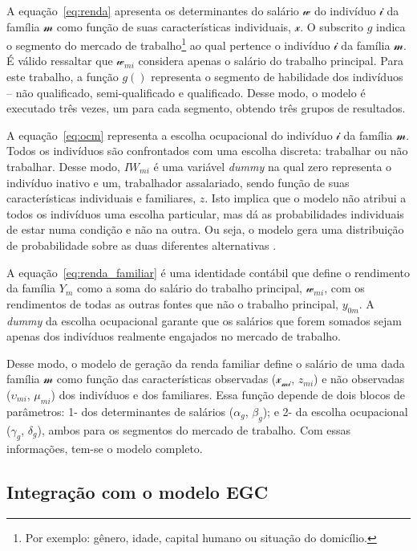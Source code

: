 A equação~\eqref{eq:renda} apresenta os determinantes do salário $\mathcal{w}$ do indivíduo $\mathcal{i}$ da família $\mathcal{m}$ como função de suas características individuais, $\mathcal{x}$. O subscrito $g$ indica o segmento do mercado de trabalho\footnote{Por exemplo: gênero, idade, capital humano ou situação do domicílio.} ao qual pertence o indivíduo $\mathcal{i}$ da família $\mathcal{m}$. É válido ressaltar que  $\mathcal{w}_{mi}$ considera apenas o salário do trabalho principal. Para este trabalho, a função $g()$ representa o segmento de habilidade dos indivíduos -- não qualificado, semi-qualificado e qualificado. Desse modo, o modelo é executado três vezes, um para cada segmento, obtendo três grupos de resultados.

A equação~\eqref{eq:ocm} representa a escolha ocupacional do indivíduo $\mathcal{i}$ da família $\mathcal{m}$. Todos os indivíduos são confrontados com uma escolha discreta: trabalhar ou não trabalhar. Desse modo, $IW_{mi}$ é uma variável \textit{dummy} na qual zero representa o indivíduo inativo e um, trabalhador assalariado, sendo função de suas características individuais e familiares, $z$. Isto implica que o modelo não atribui a todos os indivíduos uma escolha particular, mas dá as probabilidades individuais de estar numa condição e não na outra. Ou seja, o modelo gera uma distribuição de probabilidade sobre as duas diferentes alternativas \cite{colombo08}.

A equação~\eqref{eq:renda_familiar} é uma identidade contábil que define o rendimento da família $Y_m$ como a soma do salário do trabalho principal, $\mathcal{w}_{mi}$, com os rendimentos de todas as outras fontes que não o trabalho principal, $y_{0m}$. A \textit{dummy} da escolha ocupacional garante que os salários que forem somados sejam apenas dos indivíduos realmente engajados no mercado de trabalho.

Desse modo, o modelo de geração da renda familiar define o salário de uma dada família $\mathcal{m}$ como função das características observadas ($\mathcal{x_{mi}}$, $z_{mi}$) e não observadas ($\upsilon_{mi}$, $\mu_{mi}$) dos indivíduos e dos familiares. Essa função depende de dois blocos de parâmetros: 1- dos determinantes de salários ($\alpha_g$, $\beta_g$); e 2- da escolha ocupacional ($\gamma_g$, $\delta_g$), ambos para os segmentos do mercado de trabalho. Com essas informações, tem-se o modelo completo.


\subsection{Integração com o modelo EGC}\label{subsec:integracao}

